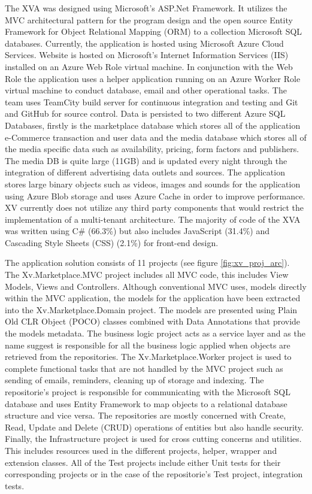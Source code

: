 The XVA was designed using Microsoft's ASP.Net Framework. It utilizes the MVC architectural pattern for the program design and the open source Entity Framework for Object Relational Mapping (ORM) to a collection Microsoft SQL databases. Currently, the application is hosted using Microsoft Azure Cloud Services. Website is hosted on Microsoft's Internet Information Services (IIS) installed on an Azure Web Role virtual machine. In conjunction with the Web Role the application uses a helper application running on an Azure Worker Role virtual machine to conduct database, email and other operational tasks. The team uses TeamCity build server for continuous integration and testing and Git and GitHub for source control. Data is persisted to two different Azure SQL Databases, firstly is the marketplace database which stores all of the application e-Commerce transaction and user data and the media database which stores all of the media specific data such as availability, pricing, form factors and publishers. The media DB is quite large (11GB) and is updated every night through the integration of different advertising data outlets and sources. The application stores large binary objects such as videos, images and sounds for the application using Azure Blob storage and uses Azure Cache in order to improve performance. XV currently does not utilize any third party components that would restrict the implementation of a multi-tenant architecture. The majority of code of the XVA was written using C\# (66.3\%) but also includes JavaScript (31.4\%) and Cascading Style Sheets (CSS) (2.1\%) for front-end design.



The application solution consists of 11 projects (see figure \ref{fig:xv_proj_arc}). The Xv.Marketplace.MVC project includes all MVC code, this includes View Models, Views and Controllers. Although conventional MVC uses, models directly within the MVC application, the models for the application have been extracted into the Xv.Marketplace.Domain project. The models are presented using Plain Old CLR Object (POCO) classes combined with Data Annotations that provide the models metadata. The business logic project acts as a service layer and as the name suggest is responsible for all the business logic applied when objects are retrieved from the repositories. The Xv.Marketplace.Worker project is used to complete functional tasks that are not handled by the MVC project such as sending of emails, reminders, cleaning up of storage and indexing. The repositorie's project is responsible for communicating with the Microsoft SQL database and uses Entity Framework to map objects to a relational database structure and vice versa. The repositories are mostly concerned with Create, Read, Update and Delete (CRUD) operations of entities but also handle security. Finally, the Infrastructure project is used for cross cutting concerns and utilities. This includes resources used in the different projects, helper, wrapper and extension classes. All of the Test projects include either Unit tests for their corresponding projects or in the case of the repositorie's Test project, integration tests.


